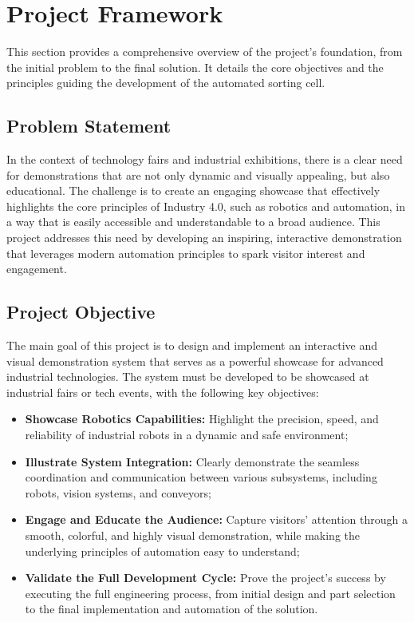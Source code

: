     
\section{Project Framework}
This section provides a comprehensive overview of the project's foundation, from the initial problem to the final solution. It details the core objectives and the principles guiding the development of the automated sorting cell.
\subsection{Problem Statement}
In the context of technology fairs and industrial exhibitions, there is a clear need for demonstrations that are not only dynamic and visually appealing, but also educational. The challenge is to create an engaging showcase that effectively highlights the core principles of Industry 4.0, such as robotics and automation, in a way that is easily accessible and understandable to a broad audience. This project addresses this need by developing an inspiring, interactive demonstration that leverages modern automation principles to spark visitor interest and engagement.

\subsection{Project Objective}
The main goal of this project is to design and implement an interactive and visual demonstration system that serves as a powerful showcase for advanced industrial technologies. The system must be developed to be showcased at industrial fairs or tech events, with the following key objectives:
\begin{itemize}
\item \textbf{Showcase Robotics Capabilities:} Highlight the precision, speed, and reliability of industrial robots in a dynamic and safe environment;
\item \textbf{Illustrate System Integration:} Clearly demonstrate the seamless coordination and communication between various subsystems, including robots, vision systems, and conveyors;
\item \textbf{Engage and Educate the Audience:} Capture visitors' attention through a smooth, colorful, and highly visual demonstration, while making the underlying principles of automation easy to understand;
\item \textbf{Validate the Full Development Cycle:} Prove the project's success by executing the full engineering process, from initial design and part selection to the final implementation and automation of the solution.
\end{itemize}

